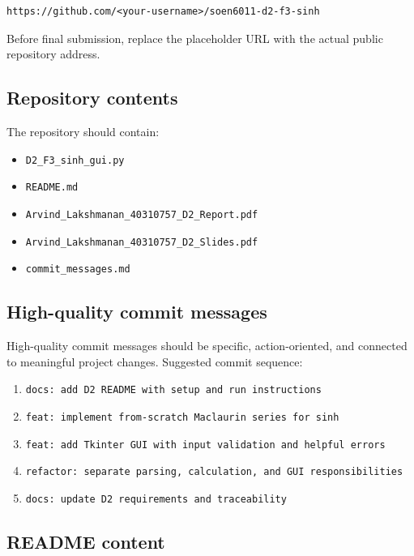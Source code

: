 \documentclass[11pt]{article}
\begin{document}
\begin{lstlisting}[style=textstyle]
https://github.com/<your-username>/soen6011-d2-f3-sinh
\end{lstlisting}

Before final submission, replace the placeholder URL with the actual public repository address.

\subsection{Repository contents}

The repository should contain:

\begin{itemize}
    \item \texttt{D2\_F3\_sinh\_gui.py}
    \item \texttt{README.md}
    \item \texttt{Arvind\_Lakshmanan\_40310757\_D2\_Report.pdf}
    \item \texttt{Arvind\_Lakshmanan\_40310757\_D2\_Slides.pdf}
    \item \texttt{commit\_messages.md}
\end{itemize}

\subsection{High-quality commit messages}

High-quality commit messages should be specific, action-oriented, and connected to meaningful project changes. Suggested commit sequence:

\begin{enumerate}
    \item \texttt{docs: add D2 README with setup and run instructions}
    \item \texttt{feat: implement from-scratch Maclaurin series for sinh}
    \item \texttt{feat: add Tkinter GUI with input validation and helpful errors}
    \item \texttt{refactor: separate parsing, calculation, and GUI responsibilities}
    \item \texttt{docs: update D2 requirements and traceability}
\end{enumerate}

\subsection{README content}
\end{document}
